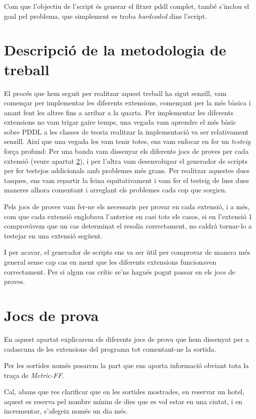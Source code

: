\documentclass[11pt,a4paper]{article}
\begin{document}
Com que l'objectiu de l'script és generar el fitxer pddl complet, també s'inclou el goal pel problema, que simplement es troba \emph{hardcoded} dins l'script.

\section{Descripció de la metodologia de treball}

El procés que hem seguit per realitzar aquest treball ha sigut senzill, vam començar per implementar les diferents extensions, començant per la més bàsica i anant fent les altres fins a arribar a la quarta. Per implementar les diferents extensions no vam trigar gaire temps, una vegada vam aprendre el més bàsic sobre PDDL a les classes de teoria realitzar la implementació va ser relativament senzill. Així que una vegada les vam tenir totes, ens vam enfocar en fer un \emph{testeig} força profund: Per una banda vam dissenyar els diferents jocs de proves per cada extensió (veure apartat \ref{sec:proves}), i per l'altra vam desenvolupar el generador de scripts per fer testejos addicionals amb problemes més grans. Per realitzar aquestes dues tasques, ens vam repartir la feina equitativament i vam fer el testeig de lues dues maneres alhora comentant i arreglant els problemes cada cop que sorgien.

Pels jocs de proves vam fer-ne els necessaris per provar en cada extensió, i a més, com que cada extensió englobava l'anterior en casi tots els casos, si en l'extensió 1 comprovàvem que un cas determinat el resolia correctament, no caldrà tornar-lo a testejar en una extensió següent.

I per acavar, el generador de scripts ens va ser útil per comprovar de manera més general sense cap cas en ment que les diferents extensions funcionaven correctament. Per si algun cas crític se'ns hagués pogut passar en els jocs de proves.

\section{Jocs de prova}
\label{sec:proves}

En aquest apartat explicarem els diferents jocs de prova que hem dissenyat per a cadascuna de les extensions del programa tot comentant-ne la sortida.

Per les sortides només posarem la part que ens aporta informació obviant tota la traça de \emph{Metric-FF}. 

Cal, abans que res clarificar que en les sortides mostrades, en reservar un hotel, aquest es reserva pel nombre mínim de dies que es vol estar en una ciutat, i en incrementar, s'afegeix només un dia més.
\end{document}
